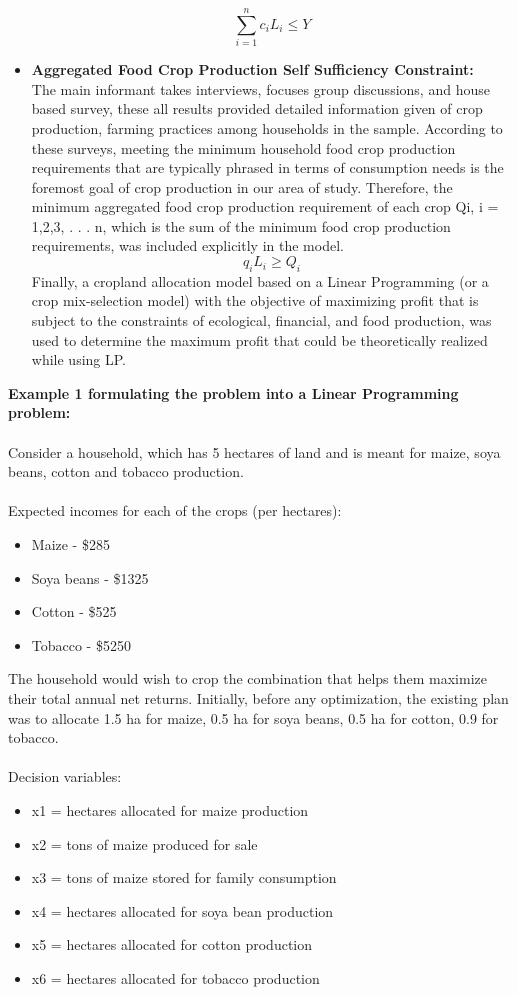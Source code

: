 \documentclass[conference]{IEEEtran}
\begin{document}
\begin{itemize}
    \[ \sum_{i=1}^{n} c_{i}L_{i} \leq Y \]
    \item \textbf{Aggregated Food Crop Production Self Sufficiency Constraint:}\\ The main informant takes interviews, focuses group discussions, and house based survey, these all results provided detailed information given of crop production, farming practices among households in the sample. According to these surveys, meeting the minimum household food crop production requirements that are typically phrased in terms of consumption needs is the foremost goal of crop production in our area of study. Therefore, the minimum aggregated food crop production requirement of each crop Qi, i = 1,2,3, . . . n, which is the sum of the minimum food crop production requirements, was included explicitly in the model. \\
    \[  q_{i}L_{i} \geq Q_{i} \]
    Finally, a cropland allocation model based on a Linear Programming (or a crop mix-selection model) with the objective of maximizing profit that is subject to the constraints of ecological, financial, and food production, was used to determine the maximum profit that could be theoretically realized while using LP.   
  
\end{itemize}
\textbf{Example 1 formulating the problem into a Linear Programming problem:}
\\\\
Consider a household, which has 5 hectares of land and is meant for maize, soya beans, cotton and tobacco production. 
\\\\
Expected incomes for each of the crops (per hectares):
\small{
\begin{itemize}
    \item Maize - \$285
    \item Soya beans - \$1325
    \item Cotton - \$525
    \item Tobacco - \$5250
\end{itemize}
}
The household would wish to crop the combination that helps them maximize their total annual net returns. Initially, before any optimization, the existing plan was to allocate 1.5 ha for maize, 0.5 ha for soya beans, 0.5 ha for cotton, 0.9 for tobacco.
\\\\
Decision variables:
\small{
\begin{itemize}
    \item x1 =  hectares allocated for maize production
    \item x2 = tons of maize produced for sale
    \item x3 = tons of maize stored for family consumption
    \item x4 = hectares allocated for soya bean production
    \item x5 = hectares allocated for cotton production
    \item x6 = hectares allocated for tobacco production
\end{itemize}
}
\end{document}
